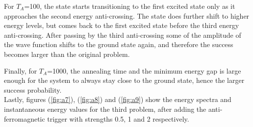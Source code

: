 \documentclass[../main.tex]{subfiles}
\begin{document}
For $T_A$=100, the state starts transitioning to the first excited state only as it approaches the second energy anti-crossing. The state does further shift to higher energy levels, but comes back to the first excited state before the third energy anti-crossing. After passing by the third anti-crossing some of the amplitude of the wave function shifts to the ground state again, and therefore the success becomes larger than the original problem. 


Finally, for $T_A$=1000, the annealing time and the minimum energy gap is large enough for the system to always stay close to the ground state, hence the larger success probability.\\

Lastly, figures (\ref{fig:a7}), (\ref{fig:a8}) and (\ref{fig:a9}) show the energy spectra and instantaneous energy values for the third problem, after adding the anti-ferromagnetic trigger with strengths 0.5, 1 and 2 respectively. 
\end{document}
